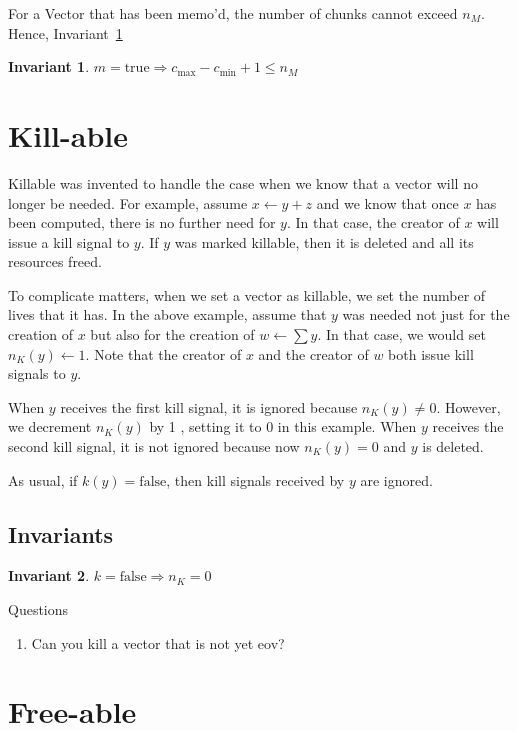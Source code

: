 \documentclass[letterpaper,12pt]{article}
\newtheorem{invariant}{Invariant}
\newcommand{\be}{\begin{enumerate}}
\newcommand{\ee}{\end{enumerate}}
\begin{document}
For a Vector that has been memo'd, the number of chunks cannot exceed \(n_M\).
Hence, Invariant~\ref{m_3}
\begin{invariant}
\label{m_3}
  \(m = \mathrm{true} \Rightarrow c_{\mathrm{max}} - c_{\mathrm{min}} + 1 \leq n_M\)
\end{invariant}

\section{Kill-able}
\label{kill}

Killable was invented to handle the case when we know that a vector will no
longer be needed. For example, assume \(x \leftarrow y + z\) and we know that
once \(x\) has been computed, there is no further need for \(y\). In that
case, the creator of \(x\) will issue a kill signal to \(y\). If \(y\) was
marked killable, then it is deleted and all its resources freed. 

To complicate matters, when we set a vector as killable, we set the number of
lives that it has. In the above example, assume that \(y\) was needed not just
for the creation of \(x\) but also for the creation of \(w \leftarrow \sum y\).
In that case, we would set \(n_K(y) \leftarrow 1\). Note that the creator of \(x\) and
the creator of \(w\) both issue kill signals to \(y\). 

When \(y\) receives the first kill signal, 
it is ignored because \(n_K(y) \neq 0\). However, we decrement
\(n_K(y)\) by 1 , setting it to 0 in this example.
When \(y\) receives the second kill signal, 
it is not ignored because now \(n_K(y) = 0\) and \(y\) is deleted.

As usual, if \(k(y) = \mathrm{false}\), then kill signals received by \(y\) are ignored.

\subsection{Invariants}
\begin{invariant}
\(k = \mathrm{false} \Rightarrow n_K = 0\)
\end{invariant}

Questions
\be
\item Can you kill a vector that is not yet eov?
\ee

\section{Free-able}
\label{early_free}
\end{document}
